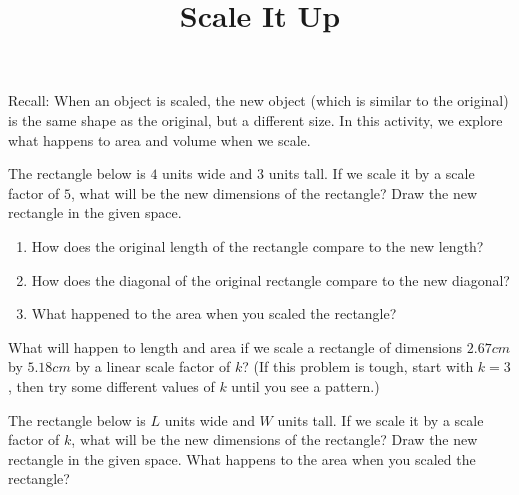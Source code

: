 \documentclass[nooutcomes,noauthor, handout]{ximera}
\begin{document}



%


\title{Scale It Up}
\begin{abstract}
\end{abstract}

\maketitle


Recall: When an object is scaled, the new object (which is similar to the original) is the same shape as the original, but a different size.  In this activity, we explore what happens to area and volume when we scale.



\begin{problem}
The rectangle below is $4$ units wide and $3$ units tall. If we scale it by a scale factor of $5$, what will be the new dimensions of the rectangle? Draw the new rectangle in the given space.\\

 \hspace{4cm}
\vskip 2.5in

\begin{enumerate}
    \item How does the original length of the rectangle compare to the new length?
    \item How does the diagonal of the original rectangle compare to the new diagonal?
    \item What happened to the area when you scaled the rectangle?
\end{enumerate}


\end{problem}


\begin{problem}
What will happen to length and area if we scale a rectangle of dimensions $2.67 cm$ by $5.18 cm$ by a linear scale factor of $k$? (If this problem is tough, start with $k=3$, then try some different values of $k$ until you see a pattern.)

\end{problem}



\begin{problem}
The rectangle below is $L$ units wide and $W$ units tall. If we scale it by a scale factor of $k$, what will be the new dimensions of the rectangle? Draw the new rectangle in the given space. What happens to the area when you scaled the rectangle?\\

 \hspace{4cm}
\vskip 2.5in

\end{problem}
\end{document}
